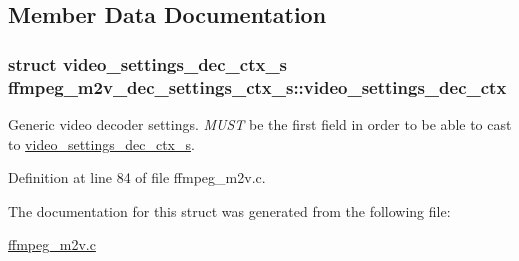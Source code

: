 \subsection{Member Data Documentation}
\subsubsection[{\texorpdfstring{video\+\_\+settings\+\_\+dec\+\_\+ctx}{video_settings_dec_ctx}}]{\setlength{\rightskip}{0pt plus 5cm}struct {\bf video\+\_\+settings\+\_\+dec\+\_\+ctx\+\_\+s} ffmpeg\+\_\+m2v\+\_\+dec\+\_\+settings\+\_\+ctx\+\_\+s\+::video\+\_\+settings\+\_\+dec\+\_\+ctx}\hypertarget{structffmpeg__m2v__dec__settings__ctx__s_afb6928fa62b6cb4a3d49b5d65452aaa7}{}\label{structffmpeg__m2v__dec__settings__ctx__s_afb6928fa62b6cb4a3d49b5d65452aaa7}
Generic video decoder settings. {\itshape M\+U\+ST} be the first field in order to be able to cast to \hyperlink{structvideo__settings__dec__ctx__s}{video\+\_\+settings\+\_\+dec\+\_\+ctx\+\_\+s}. 

Definition at line 84 of file ffmpeg\+\_\+m2v.\+c.



The documentation for this struct was generated from the following file\+:\begin{DoxyCompactItemize}
\item 
\hyperlink{ffmpeg__m2v_8c}{ffmpeg\+\_\+m2v.\+c}\end{DoxyCompactItemize}

